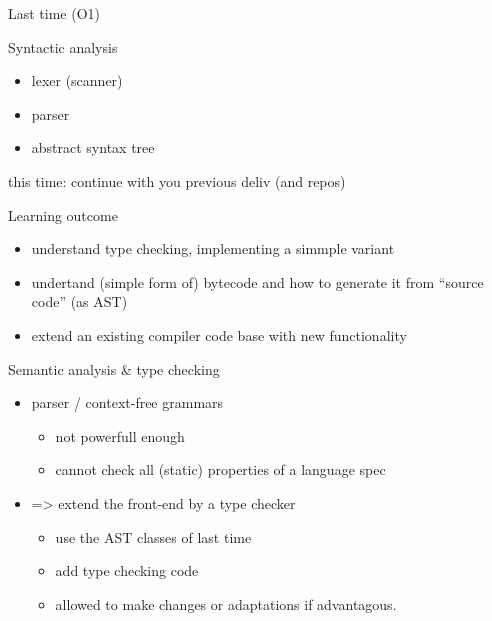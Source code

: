 \documentclass{beamer}
\begin{document}
\begin{frame}[label={sec:org4a2e64a}]{Last time (O1)}
\begin{block}{Syntactic analysis}
\begin{itemize}
\item lexer (scanner)
\item parser
\item abstract syntax tree
\end{itemize}
\end{block}



\alert{this time}: continue with you previous deliv (and repos)
\end{frame}



\begin{frame}[label={sec:org998a7d0}]{Learning outcome}
\begin{itemize}
\item understand type checking, implementing a simmple variant
\end{itemize}


\begin{itemize}
\item undertand (simple form of) bytecode and how to generate it from ``source
code'' (as AST)

\item extend an existing compiler code base with new functionality
\end{itemize}
\end{frame}



\begin{frame}[label={sec:org1a51c98}]{Semantic analysis \& type checking}
\begin{itemize}
\item parser / context-free  grammars 
\begin{itemize}
\item not powerfull enough
\item cannot check all (static) properties of a language spec
\end{itemize}

\item => extend the front-end by a type checker

\begin{itemize}
\item use the AST classes of last time
\item add type checking code
\item allowed to make \alert{changes} or adaptations if advantagous.
\end{itemize}
\end{itemize}
\end{frame}
\end{document}
